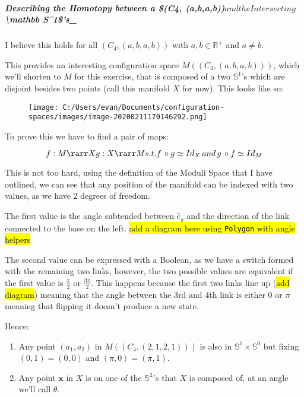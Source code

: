\documentclass[
]{article}
\begin{document}
\hypertarget{header-n53}{%
\subparagraph{\texorpdfstring{\emph{Describing the Homotopy between a
\$(C}4, (a,b,a,b))\( and the Intersecting \)\textbackslash mathbb
S\^{}1\$'s\_}{Describing the Homotopy between a \$(C4, (a,b,a,b)) and the Intersecting \textbackslash mathbb S\^{}1\$'s\_}}\label{header-n53}}

I believe this holds for all \((C_4, (a,b,a,b))\) with
\(a,b \in \mathbb R^+\) and \(a \not = b\).

This provides an interesting configuration space
\(M((C_4, (a,b,a,b)))\), which we'll shorten to \(M\) for this exercise,
that is composed of a two \(\mathbb S^1\)'s which are disjoint besides
two points (call this manifold \(X\) for now). This looks like so:

\begin{figure}
\centering
\texttt{[image: C:/Users/evan/Documents/configuration-spaces/images/image-20200211170146292.png]}
\caption{}
\end{figure}

To prove this we have to find a pair of maps:

\[f: M \rarr X \\
g: X \rarr M \\
s.t. f \, \circ g \simeq Id_X \, and \, g \, \circ f \simeq Id_{M}\]

This is not too hard, using the definition of the Moduli Space that I
have outlined, we can see that any position of the manifold can be
indexed with two values, as we have 2 degrees of freedom.

The first value is the angle subtended between \(\hat e _y\) and the
direction of the link connected to the base on the left. \hl{add a
diagram here using \texttt{Polygon} with angle helpers}

The second value can be expressed with a Boolean, as we have a switch
formed with the remaining two links, however, the two possible values
are equivalent if the first value is \(\frac \pi 2\) or
\(\frac {3 \pi} 2\). This happens because the first two links line up
(\hl{add diagram}) meaning that the angle between the 3rd and 4th link
is either 0 or \(\pi\) meaning that flipping it doesn't produce a new
state.

Hence:

\begin{enumerate}
\def\labelenumi{\arabic{enumi}.}
\item
  Any point \((a_1,a_2)\) in \(M((C_4, (2,1,2,1)))\) is also in
  \(\mathbb S^1 \times \mathbb S^0\) but fixing \((0,1) = (0,0)\) and
  \((\pi,0) = (\pi, 1)\).
\item
  Any point \(\boldsymbol{x}\) in \(X\) is on one of the
  \(\mathbb{S^1}\)'s that \(X\) is composed of, at an angle we'll call
  \(\theta\).
\end{enumerate}
\end{document}
